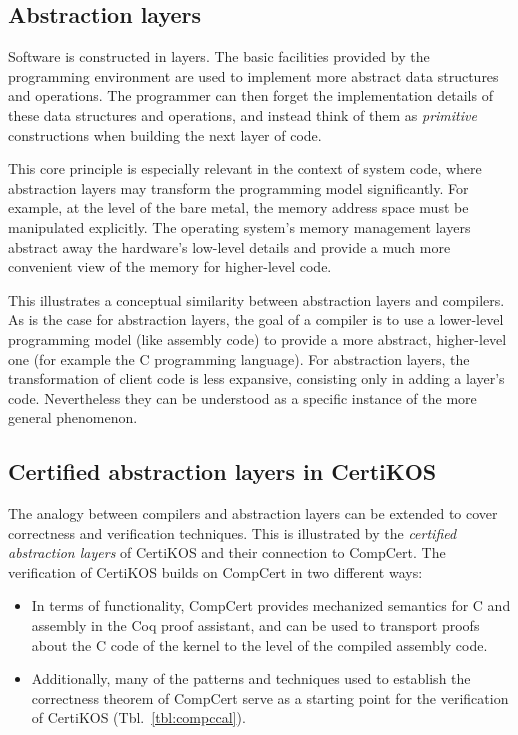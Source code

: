 \documentclass[draft,11pt]{report}
\theoremstyle{definition}
\begin{document}
\subsection{Abstraction layers} %

Software is constructed in layers.
The basic facilities provided by the programming environment
are used to implement more abstract data structures and operations.
The programmer can then forget the implementation details
of these data structures and operations,
and instead think of them as \emph{primitive} constructions
when building the next layer of code.

This core principle is especially relevant
in the context of system code,
where abstraction layers
may transform the programming model significantly.
For example,
at the level of the bare metal,
the memory address space must be manipulated explicitly.
The operating system's memory management layers
abstract away the hardware's low-level details and
provide a much more convenient view of the memory
for higher-level code.

This illustrates a conceptual similarity between
abstraction layers and compilers.
As is the case for abstraction layers,
the goal of a compiler is to use a lower-level programming model
(like assembly code)
to provide a more abstract, higher-level one
(for example the C programming language).
For abstraction layers,
the transformation of client code
is less expansive,
consisting only in adding a layer's code.
Nevertheless they can be understood as a specific instance
of the more general phenomenon.


\subsection{Certified abstraction layers in CertiKOS} %

The analogy between compilers and abstraction layers
can be extended to cover correctness and verification techniques.
This is illustrated by the \emph{certified abstraction layers}
of CertiKOS and their connection to CompCert.
The verification of CertiKOS builds on CompCert
in two different ways:
\begin{itemize}
\item
  In terms of functionality,
  CompCert provides mechanized semantics for C and assembly
  in the Coq proof assistant,
  and can be used to transport proofs about the C code of the kernel
  to the level of the compiled assembly code.
\item
  Additionally,
  many of the patterns and techniques used
  to establish the correctness theorem of CompCert
  serve as a starting point for
  the verification of CertiKOS
  (Tbl.~\ref{tbl:compccal}).
\end{itemize}
\end{document}
